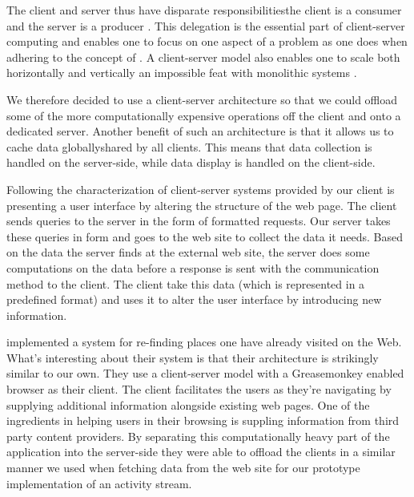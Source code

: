 The client and server thus have disparate responsibilities\dash{}the client is
a consumer and the server is a producer \citep[]{lewandowski98}.
This delegation is the
essential part of client-server computing and enables one to focus on one
aspect of a problem as one does when adhering to the concept of
 \citep[]{dijkstra82}.
A client-server model also enables one to scale both horizontally and
vertically%
\dash{}an
impossible feat with monolithic systems \citep[]{lewandowski98}.

We therefore decided to use a client-server architecture so that we could
offload some of the more computationally expensive operations off the client
and onto a dedicated server. Another benefit of such an architecture is that
it allows us to cache data globally\dash{}shared by all clients. This means
that data collection is handled on the server-side, while data display
is handled on the client-side.

\removeline

Following the characterization of client-server systems provided by
\citeauthor{sinha92} our client is presenting a user interface
by altering the structure of the \urort{} web page. The client sends queries
to the server in the form of %
formatted requests. Our server takes these queries in  form
and goes to the \urort{} web site to collect the data it needs. Based on the
data the server finds at the external \urort{} web site, the server does some
computations on the data before a response is sent
with the  communication method to the client. The client take this
data (which is represented in a predefined format) and uses it to alter the
user interface by introducing new information.

\citet[--888]{nishimoto06} implemented a system for re-finding places
one have already visited on the Web. What's interesting about their system is
that their architecture is strikingly similar to our own. They use a
client-server model with a Greasemonkey enabled browser as their client. The
client facilitates the users as they're navigating by supplying additional
information alongside existing web pages. One of the ingredients in helping
users in their browsing is suppling information from third party content
providers. By separating this computationally heavy part of the application
into the server-side they were able to offload the clients in a similar
manner we used when fetching data from the \urort{} web site for our prototype
implementation of an activity stream.

